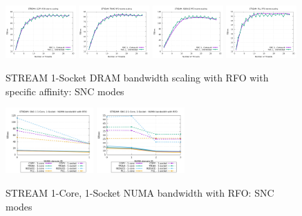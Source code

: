 \documentclass{article}
\begin{document}
\begin{figure}[!hb]
    \centering
    \includegraphics[width=0.24\textwidth]{../data/clx-8280l-snc/mem_bw_scale/mb_scale_special_Copy_rfo}
    \includegraphics[width=0.24\textwidth]{../data/clx-8280l-snc/mem_bw_scale/mb_scale_special_Triad_rfo}
    \includegraphics[width=0.24\textwidth]{../data/clx-8280l-snc/mem_bw_scale/mb_scale_special_Reduce_rfo}
    \includegraphics[width=0.24\textwidth]{../data/clx-8280l-snc/mem_bw_scale/mb_scale_special_Fill_rfo}
    \caption{STREAM 1-Socket DRAM bandwidth scaling with RFO with specific affinity: SNC modes}
    \label{figure:mem_bw_scale_special_rfo_clx_snc}
\end{figure}

\begin{figure}[!hb]
    \centering
    \includegraphics[width=0.3\textwidth]{../data/clx-8280l-snc/mem_bw_numa/SNC-1_numa_nps1_compact_rfo}
    \includegraphics[width=0.3\textwidth]{../data/clx-8280l-snc/mem_bw_numa/SNC-2_numa_nps2_compact_rfo}
    \caption{STREAM 1-Core, 1-Socket NUMA bandwidth with RFO: SNC modes}
    \label{figure:mem_bw_numa_rfo_clx_snc}
\end{figure}
\end{document}
